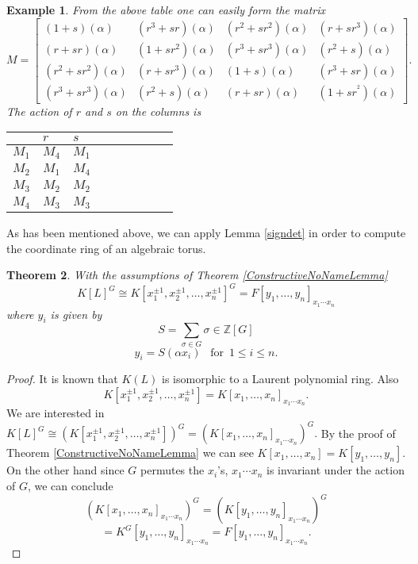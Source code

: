 \documentclass[12pt]{article}
\theoremstyle{plain}
\newtheorem{theorem}{Theorem}
\newtheorem{example}[theorem]{Example}
\newcommand{\Z}{\ensuremath{\mathbb{Z}}}
\begin{document}
\begin{example}
From the above table one can easily form the matrix 
$$
M= \begin{bmatrix}
(1+s)(\alpha) & (r^3+sr)(\alpha) & (r^2+sr^2)(\alpha) & (r+sr^3)(\alpha)\\
(r+sr)(\alpha) & (1+sr^2)(\alpha) & (r^3+sr^3)(\alpha) & (r^2+s)(\alpha)\\
(r^2+sr^2)(\alpha) & (r+sr^3)(\alpha) & (1+s)(\alpha) & (r^3+sr)(\alpha)\\
(r^3+sr^3)(\alpha) & (r^2+s)(\alpha) & (r+sr)(\alpha) & (1+sr^^2)(\alpha)
\end{bmatrix}.
$$
The action of $r$ and $s$ on the columns is
\begin{table}[H]
\centering
\begin{tabular}{l|llllllll} 
 & $r$ & $s$ \\
 \hline
 $M_1$  & $M_4$ & $M_1$ \\
$M_2$ & $M_1$ & $M_4$ \\
$M_3$ & $M_2$ & $M_2$ \\
$M_4$ & $M_3$ & $M_3$ \\
\end{tabular}
\end{table}

\end{example} 

As has been mentioned above, we can apply Lemma \ref{signdet} in order to compute the coordinate ring of an algebraic torus. 
\begin{theorem}
With the assumptions of Theorem \ref{ConstructiveNoNameLemma} $$K[L]^G \cong K[x^{\pm 1}_1, x^{\pm 1}_2, \ldots , x^{\pm 1}_n]^G = F[y_1, \ldots , y_n]_{x_1\cdots x_n}$$ where $ y_i$ is given by $$S = \sum_{\sigma \in G} \sigma \in \Z[G]$$
$$y_i = S(\alpha x_i)  \,\,\,\,\, \text{for} \,\,\, 1\leq i \leq n.$$
\end{theorem}
\begin{proof}
It is known that $K(L)$ is isomorphic to a Laurent polynomial ring. Also $$K[x^{\pm 1}_1, x^{\pm 1}_2, \ldots , x^{\pm 1}_n] = K[x_1, \ldots , x_n]_{x_1\cdots x_n}.$$ We are interested in $K[L]^G \cong \left( K[x^{\pm 1}_1, x^{\pm 1}_2, \ldots , x^{\pm 1}_n] \right)^G = \left(K[x_1, \ldots , x_n]_{x_1\cdots x_n} \right) ^G.$ By the proof of Theorem \ref{ConstructiveNoNameLemma} we can see $K[x_1, \ldots , x_n] = K[y_1, \ldots , y_n]$. 
On the other hand since $G$ permutes the $x_i$'s, $x_1\cdots x_n$ is invariant under the action of $G$, we can conclude $$\left( K[x_1, \ldots , x_n]_{x_1\cdots x_n}\right)^G =  \left( K[y_1, \ldots , y_n]_{x_1\cdots x_n} \right)^G$$$$ = K^G [y_1, \ldots , y_n]_{x_1\cdots x_n} =  F[y_1, \ldots , y_n]_{x_1\cdots x_n}.$$ 
\end{proof}
\end{document}

